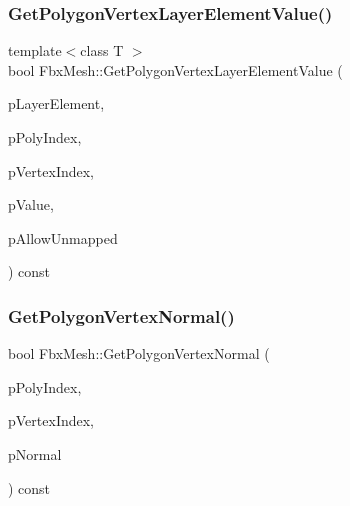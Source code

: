 \mbox{\label{class_fbx_mesh_aaa40241afa27d42fbacb6d78f00a947b}} 
\subsubsection{\texorpdfstring{Get\+Polygon\+Vertex\+Layer\+Element\+Value()}{GetPolygonVertexLayerElementValue()}}
{\footnotesize\ttfamily template$<$class T $>$ \\
bool Fbx\+Mesh\+::\+Get\+Polygon\+Vertex\+Layer\+Element\+Value (\begin{DoxyParamCaption}\item[{const \hyperlink{class_fbx_layer_element_template}{Fbx\+Layer\+Element\+Template}$<$ T $>$ $\ast$}]{p\+Layer\+Element,  }\item[{int}]{p\+Poly\+Index,  }\item[{int}]{p\+Vertex\+Index,  }\item[{T \&}]{p\+Value,  }\item[{bool}]{p\+Allow\+Unmapped }\end{DoxyParamCaption}) const\hspace{0.3cm}{\ttfamily [protected]}}

\mbox{\label{class_fbx_mesh_a0a761b70353b1ac6ed016fba192ee667}} 
\subsubsection{\texorpdfstring{Get\+Polygon\+Vertex\+Normal()}{GetPolygonVertexNormal()}}
{\footnotesize\ttfamily bool Fbx\+Mesh\+::\+Get\+Polygon\+Vertex\+Normal (\begin{DoxyParamCaption}\item[{int}]{p\+Poly\+Index,  }\item[{int}]{p\+Vertex\+Index,  }\item[{\hyperlink{class_fbx_vector4}{Fbx\+Vector4} \&}]{p\+Normal }\end{DoxyParamCaption}) const}

